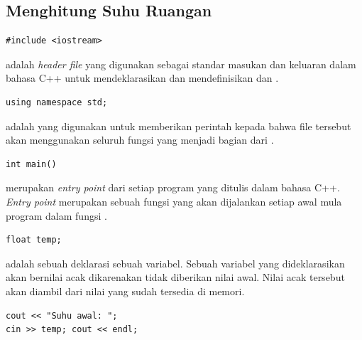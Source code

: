 \documentclass[../main.tex]{subfiles}
\begin{document}
\subsection{Menghitung Suhu Ruangan}
\begin{code}
\begin{verbatim}
#include <iostream>
\end{verbatim}
\end{code}

{\Script}  adalah \textit{header file} yang digunakan sebagai standar masukan dan keluaran dalam bahasa C++ untuk mendeklarasikan dan mendefinisikan {\statement}  dan .

\begin{code}
\begin{verbatim}
using namespace std;    
\end{verbatim}
\end{code}

{\Script}  adalah {\statement} yang digunakan untuk memberikan perintah kepada {\compiler} bahwa file tersebut akan menggunakan seluruh fungsi yang menjadi bagian dari .

\begin{code}
\begin{verbatim}
int main()
\end{verbatim}
\end{code}

{\Script}  merupakan \textit{entry point} dari setiap program yang ditulis dalam bahasa C++. \textit{Entry point} merupakan sebuah fungsi yang akan dijalankan setiap awal mula program dalam fungsi .

\begin{code}
\begin{verbatim}
float temp;
\end{verbatim}
\end{code}

{\Script}  adalah sebuah {\statement} deklarasi sebuah variabel. Sebuah variabel yang dideklarasikan akan bernilai acak dikarenakan tidak diberikan nilai awal. Nilai acak tersebut akan diambil dari nilai yang sudah tersedia di memori.

\begin{code}
\begin{verbatim}
cout << "Suhu awal: ";
cin >> temp; cout << endl;
\end{verbatim}
\end{code}
\end{document}
